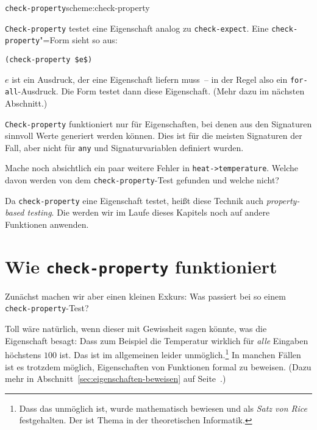 \begin{feature}{\lstinline{check-property}}{scheme:check-property}

\lstinline{Check-property}
testet eine Eigenschaft analog zu \lstinline{check-expect}.  Eine
\lstinline{check-property}"=Form sieht so aus:
%
\begin{lstlisting}
(check-property $e$) 
\end{lstlisting}
%
$e$ ist ein Ausdruck, der eine Eigenschaft liefern muss~-- in der Regel
also ein \lstinline{for-all}-Ausdruck.  Die Form testet dann diese
Eigenschaft.  (Mehr dazu im nächsten Abschnitt.)

\lstinline{Check-property} funktioniert nur für Eigenschaften, bei
denen aus den Signaturen sinnvoll Werte generiert werden können.  Dies
ist für die meisten Signaturen der Fall, aber nicht für
\lstinline{any} und Signaturvariablen definiert wurden.
\end{feature}

\begin{aufgabeinline}
  Mache noch absichtlich ein paar weitere Fehler in
  \lstinline{heat->temperature}.  Welche davon werden von dem
  \lstinline{check-property}-Test gefunden und welche nicht?
\end{aufgabeinline}

Da \lstinline{check-property} eine Eigenschaft testet, heißt diese
Technik auch \textit{property-based testing}.  Die werden wir im Laufe dieses Kapitels noch auf andere
Funktionen anwenden.

\section{Wie \lstinline{check-property} funktioniert}

Zunächst machen wir aber einen kleinen Exkurs: Was passiert
bei so einem \lstinline{check-property}-Test?

Toll wäre natürlich, wenn dieser mit Gewissheit sagen könnte, was die
Eigenschaft besagt: Dass zum Beispiel die Temperatur wirklich für
\emph{alle} Eingaben höchstens $100$ ist.  Das ist im allgemeinen leider
unmöglich.\footnote{Dass das unmöglich ist, wurde mathematisch
  bewiesen und als \textit{Satz von Rice} festgehalten.  Der ist Thema
  in der theoretischen Informatik.}  In manchen Fällen ist es trotzdem
möglich, Eigenschaften von Funktionen formal zu beweisen.  (Dazu mehr in
Abschnitt~\ref{sec:eigenschaften-beweisen} auf
Seite~\pageref{sec:eigenschaften-beweisen}.)


